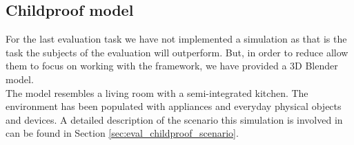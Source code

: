 \subsection{Childproof model} %
\label{subsec:impl_childproof_model}
For the last evaluation task we have not implemented a simulation as that is the task the subjects of the evaluation will outperform. But, in order to reduce allow them to focus on working with the framework, we have provided a 3D Blender model.\\

The model resembles a living room with a semi-integrated kitchen. The environment has been populated with appliances and everyday physical objects and devices. A detailed description of the scenario this simulation is involved in can be found in Section \ref{sec:eval_childproof_scenario}.

